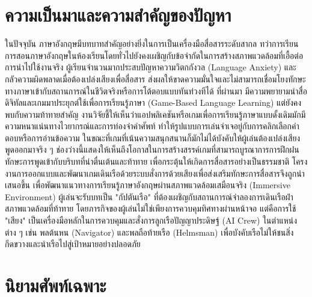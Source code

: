 
\section{ความเป็นมาและความสำคัญของปัญหา}
ในปัจจุบัน ภาษาอังกฤษมีบทบาทสำคัญอย่างยิ่งในการเป็นเครื่องมือสื่อสารระดับสากล ทว่าการเรียนการสอนภาษาอังกฤษในห้องเรียนโดยทั่วไปยังคงเผชิญกับข้อจำกัดในการสร้างสภาพแวดล้อมที่เอื้อต่อการนำไปใช้งานจริง\cite{sadigzade2025} ผู้เรียนจำนวนมากประสบปัญหาความวิตกกังวล (Language Anxiety) และกลัวความผิดพลาดเมื่อต้องเปล่งเสียงเพื่อสื่อสาร ส่งผลให้ขาดความมั่นใจและไม่สามารถเชื่อมโยงทักษะทางภาษาเข้ากับสถานการณ์ในชีวิตจริงหรือการโต้ตอบแบบทันท่วงทีได้\cite{varma2025} 
ที่ผ่านมา มีความพยายามนำสื่อดิจิทัลและเกมมาประยุกต์ใช้เพื่อการเรียนรู้ภาษา (Game-Based Language Learning) แต่ยังคงพบกับความท้าทายสำคัญ\cite{sadigzade2025, sanchez2010, allain2015} งานวิจัยชี้ให้เห็นว่าแอปพลิเคชันหรือเกมเพื่อการเรียนรู้ภาษาแบบดั้งเดิมมักมีความหนาแน่นทางไวยากรณ์และการท่องจำคำศัพท์ ทำให้รูปแบบการเล่นจำเจอยู่กับการคลิกเลือกคำตอบหรือการอ่านข้อความ ในขณะที่เกมที่เน้นความสนุกสนานก็มักไม่ได้บังคับให้ผู้เล่นต้องเปล่งเสียงพูดออกมาจริง ๆ\cite{varma2025} ช่องว่างนี้แสดงให้เห็นถึงโอกาสในการสร้างสรรค์เกมที่สามารถบูรณาการการฝึกฝนทักษะการพูดเข้ากับบริบทที่น่าตื่นเต้นและท้าทาย เพื่อกระตุ้นให้เกิดการสื่อสารอย่างเป็นธรรมชาติ\cite{zargham2024}
โครงงานการออกแบบและพัฒนาเกมเดินเรือด้วยระบบสั่งการด้วยเสียงเพื่อส่งเสริมทักษะการสื่อสารจึงถูกนำเสนอขึ้น เพื่อพัฒนาแนวทางการเรียนรู้ภาษาอังกฤษผ่านสภาพแวดล้อมเสมือนจริง (Immersive Environment) ผู้เล่นจะรับบทเป็น "กัปตันเรือ" ที่ต้องเผชิญกับสถานการณ์จำลองการเดินเรือฝ่าสภาพแวดล้อมที่ท้าทาย โดยภารกิจของผู้เล่นไม่ใช่เพียงการควบคุมทิศทางผ่านหน้าจอ แต่คือการใช้ "เสียง" เป็นเครื่องมือหลักในการควบคุมและสั่งการลูกเรือปัญญาประดิษฐ์ (AI Crew) ในตำแหน่งต่าง ๆ เช่น พลต้นหน (Navigator) และพลถือท้ายเรือ (Helmsman) เพื่อบังคับเรือไม่ให้ชนสิ่งกีดขวางและนำเรือไปสู่เป้าหมายอย่างปลอดภัย

\section{นิยามศัพท์เฉพาะ}

